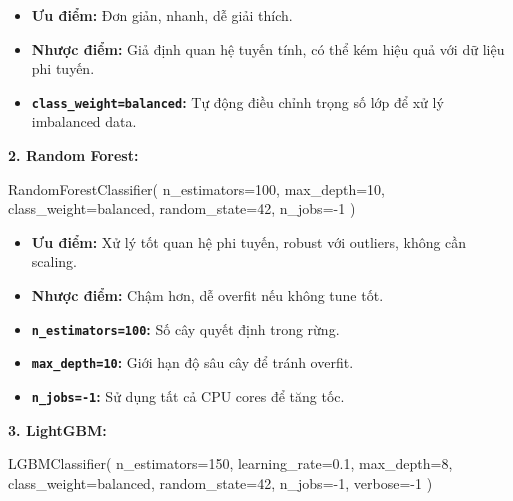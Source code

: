 \documentclass[
]{article}
\newenvironment{Shaded}{}{}
\newcommand{\DecValTok}[1]{\textcolor[rgb]{0.25,0.63,0.44}{#1}}
\newcommand{\FloatTok}[1]{\textcolor[rgb]{0.25,0.63,0.44}{#1}}
\newcommand{\NormalTok}[1]{#1}
\newcommand{\OperatorTok}[1]{\textcolor[rgb]{0.40,0.40,0.40}{#1}}
\newcommand{\StringTok}[1]{\textcolor[rgb]{0.25,0.44,0.63}{#1}}
\providecommand{\tightlist}{%
  \setlength{\itemsep}{0pt}\setlength{\parskip}{0pt}}
\begin{document}
\begin{itemize}
\tightlist
\item
  \textbf{Ưu điểm:} Đơn giản, nhanh, dễ giải thích.
\item
  \textbf{Nhược điểm:} Giả định quan hệ tuyến tính, có thể kém hiệu quả
  với dữ liệu phi tuyến.
\item
  \textbf{\texttt{class\_weight=\textquotesingle{}balanced\textquotesingle{}}:}
  Tự động điều chỉnh trọng số lớp để xử lý imbalanced data.
\end{itemize}

\textbf{2. Random Forest:}

\begin{Shaded}
\begin{Highlighting}[]
\NormalTok{RandomForestClassifier(}
\NormalTok{    n\_estimators}\OperatorTok{=}\DecValTok{100}\NormalTok{, max\_depth}\OperatorTok{=}\DecValTok{10}\NormalTok{, }
\NormalTok{    class\_weight}\OperatorTok{=}\StringTok{\textquotesingle{}balanced\textquotesingle{}}\NormalTok{, random\_state}\OperatorTok{=}\DecValTok{42}\NormalTok{, n\_jobs}\OperatorTok{={-}}\DecValTok{1}
\NormalTok{)}
\end{Highlighting}
\end{Shaded}

\begin{itemize}
\tightlist
\item
  \textbf{Ưu điểm:} Xử lý tốt quan hệ phi tuyến, robust với outliers,
  không cần scaling.
\item
  \textbf{Nhược điểm:} Chậm hơn, dễ overfit nếu không tune tốt.
\item
  \textbf{\texttt{n\_estimators=100}:} Số cây quyết định trong rừng.
\item
  \textbf{\texttt{max\_depth=10}:} Giới hạn độ sâu cây để tránh overfit.
\item
  \textbf{\texttt{n\_jobs=-1}:} Sử dụng tất cả CPU cores để tăng tốc.
\end{itemize}

\textbf{3. LightGBM:}

\begin{Shaded}
\begin{Highlighting}[]
\NormalTok{LGBMClassifier(}
\NormalTok{    n\_estimators}\OperatorTok{=}\DecValTok{150}\NormalTok{, learning\_rate}\OperatorTok{=}\FloatTok{0.1}\NormalTok{, max\_depth}\OperatorTok{=}\DecValTok{8}\NormalTok{,}
\NormalTok{    class\_weight}\OperatorTok{=}\StringTok{\textquotesingle{}balanced\textquotesingle{}}\NormalTok{, random\_state}\OperatorTok{=}\DecValTok{42}\NormalTok{, n\_jobs}\OperatorTok{={-}}\DecValTok{1}\NormalTok{, verbose}\OperatorTok{={-}}\DecValTok{1}
\NormalTok{)}
\end{Highlighting}
\end{Shaded}
\end{document}

